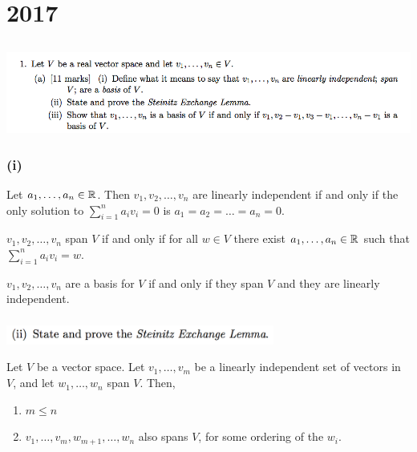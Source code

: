 \documentclass[12pt]{article}
\begin{document}
\section{2017}

\subsection*{}  %
\begin{mdframed}
\includegraphics[width=400pt]{img/oxford-prelims-2017-A-1-1.png}
\end{mdframed}

\subsubsection*{(i)}
\begin{definition*}
  Let $a_1, \ldots, a_n \in \mathbb{R}$. Then $v_1, v_2, \ldots, v_n$ are linearly
  independent if and only if the only solution to $\sum_{i=1}^n a_iv_i = 0$ is
  $a_1 = a_2 = \ldots = a_n = 0$.
\end{definition*}

\begin{definition*}[Span]
  $v_1, v_2, \ldots, v_n$ span $V$ if and only if for all $w \in V$ there exist
  $a_1, \ldots, a_n \in \mathbb{R}$ such that $\sum_{i=1}^n a_iv_i = w$.
\end{definition*}

\begin{definition*}[Basis]
  $v_1, v_2, \ldots, v_n$ are a basis for $V$ if and only if they span $V$ and
  they are linearly independent.
\end{definition*}

\subsubsection*{}
\begin{mdframed}
\includegraphics[width=250pt]{img/oxford-prelims-2017-A-1-1-2.png}
\end{mdframed}

\begin{theorem*}
  Let $V$ be a vector space. Let $v_1, \ldots, v_m$ be a linearly independent
  set of vectors in $V$, and let $w_1, \ldots, w_n$ span $V$. Then,
  \begin{enumerate}[label=\roman*)]
  \item $m \leq n$
  \item $v_1, \ldots, v_m, w_{m+1}, \ldots, w_n$ also spans $V$, for some
    ordering of the $w_i$.
  \end{enumerate}
\end{theorem*}
\end{document}
